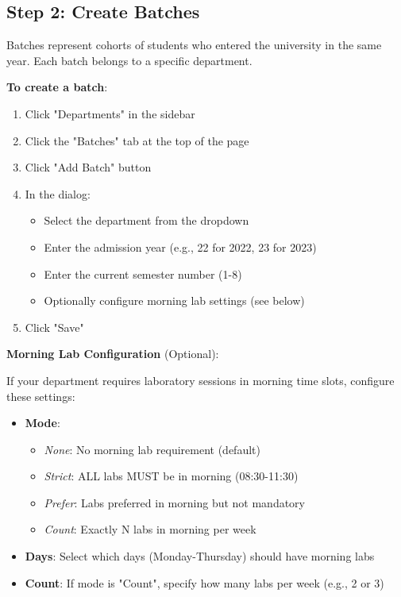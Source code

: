 \documentclass[12pt,a4paper]{article}
\begin{document}
\subsection{Step 2: Create Batches}

Batches represent cohorts of students who entered the university in the same year. Each batch belongs to a specific department.

\textbf{To create a batch}:
\begin{enumerate}
\item Click "Departments" in the sidebar
\item Click the "Batches" tab at the top of the page
\item Click "Add Batch" button
\item In the dialog:
\begin{itemize}
\item Select the department from the dropdown
\item Enter the admission year (e.g., 22 for 2022, 23 for 2023)
\item Enter the current semester number (1-8)
\item Optionally configure morning lab settings (see below)
\end{itemize}
\item Click "Save"
\end{enumerate}

\textbf{Morning Lab Configuration} (Optional):

If your department requires laboratory sessions in morning time slots, configure these settings:

\begin{itemize}
\item \textbf{Mode}:
\begin{itemize}
\item \textit{None}: No morning lab requirement (default)
\item \textit{Strict}: ALL labs MUST be in morning (08:30-11:30)
\item \textit{Prefer}: Labs preferred in morning but not mandatory
\item \textit{Count}: Exactly N labs in morning per week
\end{itemize}

\item \textbf{Days}: Select which days (Monday-Thursday) should have morning labs

\item \textbf{Count}: If mode is "Count", specify how many labs per week (e.g., 2 or 3)
\end{itemize}
\end{document}

